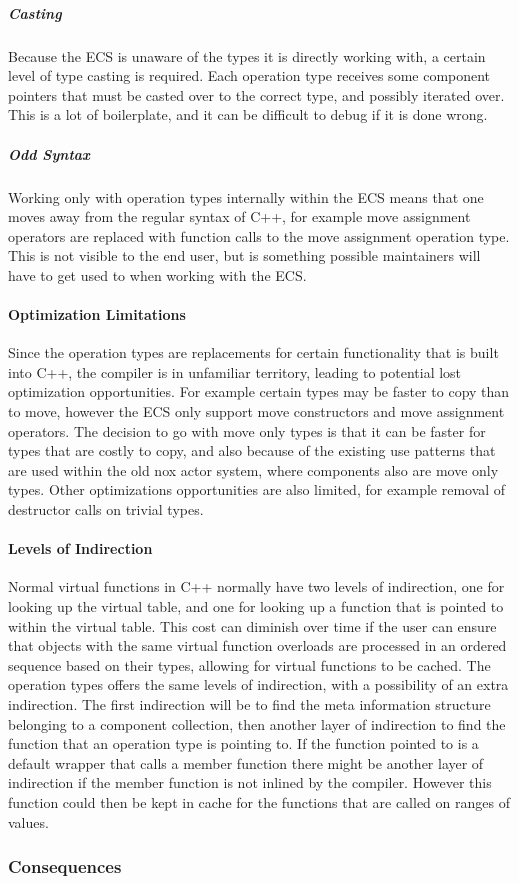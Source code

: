 \subparagraph{Casting}
Because the ECS is unaware of the types it is directly working with, a certain level of type casting is required.
Each operation type receives some component pointers that must be casted over to the correct type,
and possibly iterated over. This is a lot of boilerplate, and it can be difficult to debug if it is done wrong.

\subparagraph{Odd Syntax}
Working only with operation types internally within the ECS means that one moves away from the regular syntax of C++,
for example move assignment operators are replaced with function calls to the move assignment operation type.
This is not visible to the end user, but is something possible maintainers will have to get used to when working with the ECS.

\paragraph{Optimization Limitations}
Since the operation types are replacements for certain functionality that is built into C++, the compiler is in
unfamiliar territory, leading to potential lost optimization opportunities.
For example certain types may be faster to copy than to move, however the ECS only support move constructors
and move assignment operators.
The decision to go with move only types is that it can be faster for types that are costly to copy,
and also because of the existing use patterns that are used within the old nox actor system, where components
also are move only types.
Other optimizations opportunities are also limited, for example removal of destructor calls on trivial types.

\paragraph{Levels of Indirection}
Normal virtual functions in C++ normally have two levels of indirection, one for looking up the virtual table,
and one for looking up a function that is pointed to within the virtual table.
This cost can diminish over time if the user can ensure that objects with the same virtual function overloads
are processed in an ordered sequence based on their types, allowing for virtual functions to be cached.
The operation types offers the same levels of indirection, with a possibility of an extra indirection.
The first indirection will be to find the meta information structure belonging to a component collection,
then another layer of indirection to find the function that an operation type is pointing to.
If the function pointed to is a default wrapper that calls a member function there might be another layer of indirection
if the member function is not inlined by the compiler.
However this function could then be kept in cache for the functions that are called on ranges of values.

\subsubsection{Consequences}

